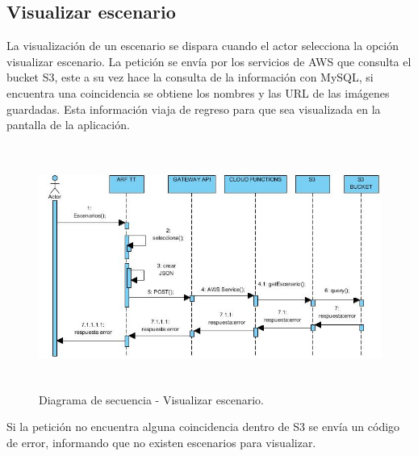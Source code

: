 \subsection{Visualizar escenario}
La visualización de un escenario se dispara cuando el actor selecciona la opción visualizar escenario. La petición se envía por los servicios de AWS que consulta el bucket S3, este a su vez hace la consulta de la información con MySQL, si encuentra una coincidencia se obtiene los nombres y las URL de las imágenes guardadas. Esta información viaja de regreso para que sea visualizada en la pantalla de la aplicación.
\vspace{5mm}
\begin{figure}[h!]
	\centering
	\includegraphics[width=14cm,height=8cm]{imagenes/analisis/DSvisualizarEscenario.jpg}
	\caption{Diagrama de secuencia - Visualizar escenario.}
	\label{fig:analogo}
\end{figure} 
\vspace{5mm} \par 
Si la petición no encuentra alguna coincidencia dentro de S3 se envía un código de error, informando que no existen escenarios para visualizar.



